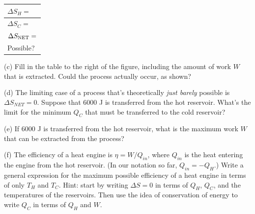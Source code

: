 \begin{center}
\vspace{-0.1 in}
\hspace{0.3in}
{\renewcommand{\arraystretch}{1.8}
\begin{tabular}{|L{1.6in}|} 
\hline $\Delta S_H =$ \\ 
\hline $\Delta S_C =$ \\ 
\hline $\Delta S_{\rm NET} =$ \\ 
\hline Possible? \\ 
\hline 
\end{tabular} 
}
\vspace{-0.1 in}
\end{center}

(c) Fill in the table to the right of the figure, including the amount of work $W$ that is extracted.  Could the process actually occur, as shown?
\answerspace{0.2 in}

(d) The limiting case of a process that's theoretically \textit{just barely} possible is $\Delta S_{NET} = 0$.  Suppose that 6000 J is transferred from the hot reservoir.  What's the limit for the minimum $Q_C$ that must be transferred to the cold reservoir?
\answerspace{0.4 in}

(e) If  6000 J is transferred from the hot reservoir, what is the maximum work $W$ that can be extracted from the process?
\answerspace{0.4 in}

\pagebreak[2]
(f) The efficiency of a heat engine is $\eta=W/Q_{in}$, where $Q_{in}$ is the heat entering the engine from the hot reservoir.  (In our notation so far, $Q_{in}=-Q_H$.)  Write a general expression for the maximum possible efficiency of a heat engine in terms of only $T_H$ and $T_C$.  Hint: start by writing $\Delta S = 0$ in terms of $Q_H$, $Q_C$, and the temperatures of the reservoirs.  Then use the idea of conservation of energy to write $Q_C$ in terms of $Q_H$ and $W$.
\answerspace{1.5 in}

